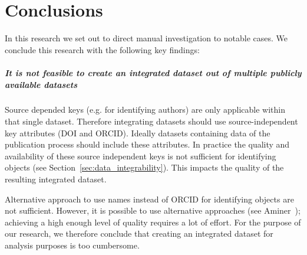 \documentclass{ou-report}
\newcommand{\doi}{{DOI}}
\newcommand{\orcid}{ORCID}
\begin{document}


\chapter{Conclusions}
\label{chp:conclusions}

In this research we set out to direct manual investigation to notable cases.
We conclude this research with the following key findings:

\paragraph{It is not feasible to create an integrated dataset out of multiple
publicly available datasets}
Source depended keys (e.g. for identifying authors) are only applicable within 
that single dataset. Therefore integrating datasets should use 
source-independent key attributes (\doi{} and \orcid{}). Ideally datasets 
containing data of the publication process should include these attributes. In 
practice the quality and availability of these source independent keys is not 
sufficient for identifying objects (see Section~\ref{sec:data_integrability}). 
This impacts the quality of the resulting integrated dataset.

Alternative approach to use names instead of \orcid{} for identifying objects are 
not sufficient. However, it is possible to use alternative approaches 
(see Aminer~\cite{Tang:08KDD}); achieving a high enough level of quality 
requires a lot of effort. For the purpose of our research, we therefore conclude 
that creating an integrated dataset for analysis purposes is too cumbersome.
\end{document}

